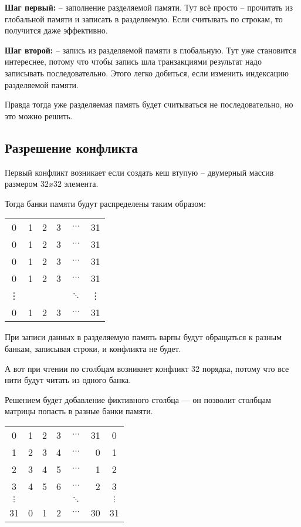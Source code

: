 \documentclass[12pt]{article}
\begin{document}
\textbf{Шаг первый:} -- заполнение разделяемой памяти.
Тут всё просто -- прочитать из глобальной памяти и записать в разделяемую.
Если считывать по строкам, то получится даже эффективно.

\textbf{Шаг второй:} -- запись из разделяемой памяти в глобальную.
Тут уже становится интереснее, потому что чтобы запись шла транзакциями
результат надо записывать последовательно.
Этого легко добиться, если изменить индексацию разделяемой памяти.

Правда тогда уже разделяемая память будет считываться не последовательно, но это можно решить.

\subsection*{Разрешение конфликта}

Первый конфликт возникает если создать кеш втупую -- двумерный массив размером $32x32$ элемента.

Тогда банки памяти будут распределены таким образом:

\smallbreak

\begin{tabular}{crrrcc}
	0      & 1 & 2 & 3 & $\cdots$ & 31     \\
	0      & 1 & 2 & 3 & $\cdots$ & 31     \\
	0      & 1 & 2 & 3 & $\cdots$ & 31     \\
	0      & 1 & 2 & 3 & $\cdots$ & 31     \\
	\vdots &   &   &   & $\ddots$ & \vdots \\
	0      & 1 & 2 & 3 & $\cdots$ & 31     \\
\end{tabular}

При записи данных в разделяемую память варпы будут обращаться к разным банкам, записывая строки, и конфликта не будет.

А вот при чтении по столбцам возникнет конфликт 32 порядка, потому что все нити будут читать из одного банка.

Решением будет добавление фиктивного столбца --- он позволит столбцам матрицы попасть в разные банки памяти.

\smallbreak

\begin{tabular}{crrrcr|c}
	0        & 1 & 2 & 3 & $\cdots$ & 31 & 0        \\
	1        & 2 & 3 & 4 & $\cdots$ & 0  & 1        \\
	2        & 3 & 4 & 5 & $\cdots$ & 1  & 2        \\
	3        & 4 & 5 & 6 & $\cdots$ & 2  & 3        \\
	$\vdots$ &   &   &   & $\ddots$ &    & $\vdots$ \\
	31       & 0 & 1 & 2 & $\cdots$ & 30 & 31       \\
\end{tabular}
\end{document}
